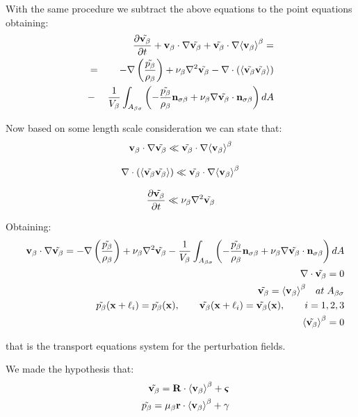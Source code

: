 With the same procedure we subtract the above equations to the point equations obtaining:
\begin{eqnarray}
& &  \frac{\partial \tilde{\textbf{v}_{\beta}}}{\partial t} + \textbf{v}_{\beta} \cdot \nabla \tilde{\textbf{v}_{\beta}} + \tilde{\textbf{v}_{\beta}} \cdot \nabla {\left< \textbf{v}_{\beta}\right>}^{\beta}  = \nonumber \\
&=& -\nabla \left(\dfrac{\tilde{p_{\beta}}}{\rho_{\beta}}\right) + \nu_{\beta} \nabla^2 \tilde{\textbf{v}_{\beta}} - \nabla \cdot \left({\left< \tilde{\textbf{v}_{\beta}} \tilde{\textbf{v}_{\beta}} \right>}\right) \nonumber \\
&-& \dfrac{1}{V_\beta} \int_{A_{\beta \sigma}} \left(-\dfrac{\tilde{p_{\beta}}}{\rho_{\beta}} \mathbf{n}_{\sigma \beta}  + \nu_{\beta} \nabla \tilde{\textbf{v}_{\beta}} \cdot \mathbf{n}_{\sigma \beta}\right) dA
\label{eq:vans_mom_3}
\end{eqnarray}

Now based on some length scale consideration we can state that:
$$ 
\textbf{v}_{\beta} \cdot \nabla \tilde{\textbf{v}_{\beta}} \ll \tilde{\textbf{v}_{\beta}} \cdot \nabla {\left< \textbf{v}_{\beta}\right>}^{\beta}
$$

$$
\nabla \cdot \left({\left< \tilde{\textbf{v}_{\beta}} \tilde{\textbf{v}_{\beta}} \right>}\right) \ll \tilde{\textbf{v}_{\beta}} \cdot \nabla {\left< \textbf{v}_{\beta}\right>}^{\beta}
$$

$$
\frac{\partial \tilde{\textbf{v}_{\beta}}}{\partial t} \ll \nu_{\beta} \nabla^2 \tilde{\textbf{v}_{\beta}}
$$

Obtaining:
\begin{eqnarray}
&& \textbf{v}_{\beta} \cdot \nabla \tilde{\textbf{v}_{\beta}} = -\nabla \left(\dfrac{\tilde{p_{\beta}}}{\rho_{\beta}}\right) + \nu_{\beta} \nabla^2 \tilde{\textbf{v}_{\beta}} - \dfrac{1}{V_\beta} \int_{A_{\beta \sigma}} \left(-\dfrac{\tilde{p_{\beta}}}{\rho_{\beta}} \mathbf{n}_{\sigma \beta}  + \nu_{\beta} \nabla \tilde{\textbf{v}_{\beta}} \cdot \mathbf{n}_{\sigma \beta}\right) dA  \\
&& \nabla \cdot \tilde{\textbf{v}_{\beta}} = 0  \\
&& \tilde{\textbf{v}_{\beta}} = {\left< \textbf{v}_{\beta} \right>}^{\beta} \quad at \; A_{\beta \sigma} \\
&& \tilde{p_{\beta}}(\mathbf{x} +\ell_i) = \tilde{p_{\beta}}(\mathbf{x}), \qquad \tilde{\textbf{v}_{\beta}}(\mathbf{x} +\ell_i) = \tilde{\textbf{v}_{\beta}}(\mathbf{x}), \qquad i=1,2,3 \\
&& {\left< \tilde{\textbf{v}_{\beta}} \right>}^{\beta} = 0
\label{eq:vans_mom_}
\end{eqnarray}

that is the transport equations system for the perturbation fields.

We made the hypothesis that:
\begin{eqnarray}
&& \tilde{\textbf{v}_{\beta}} = \mathbf{R} \cdot {\left< \textbf{v}_{\beta}\right>}^{\beta} + \boldsymbol{\varsigma} \\
&& \tilde{p_{\beta}} = \mu_{\beta} \mathbf{r} \cdot {\left< \textbf{v}_{\beta}\right>}^{\beta} + \gamma
\end{eqnarray}

